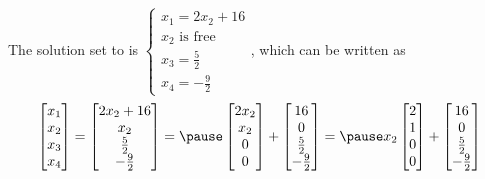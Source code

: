 \documentclass{beamer}
\theoremstyle{definition}
\theoremstyle{remark}
\begin{document}
\begin{frame}[t]
\begin{example}
The solution set to  is $\begin{cases}
x_1=2x_2+16\\
x_2\text{ is free}\\
x_3=\frac{5}{2}\\
x_4=-\frac{9}{2}
\end{cases}$\pause, which can be written as
\[
\begin{bmatrix}
x_1\\x_2\\x_3\\x_4
\end{bmatrix}=\begin{bmatrix}
2x_2+16\\x_2\\\frac{5}{2}\\-\frac{9}{2}
\end{bmatrix}=\pause\begin{bmatrix}
2x_2\\x_2\\0\\0
\end{bmatrix}+\begin{bmatrix}
16\\0\\\frac{5}{2}\\-\frac{9}{2}
\end{bmatrix}=\pause x_2\begin{bmatrix}
2\\1\\0\\0
\end{bmatrix}+\begin{bmatrix}
16\\0\\\frac{5}{2}\\-\frac{9}{2}
\end{bmatrix}
\]
\end{example}
\end{frame}
\end{document}
